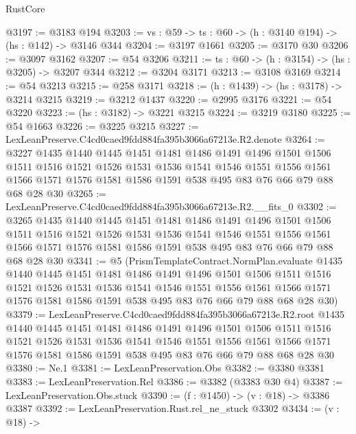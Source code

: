 \begin{lexlean}{RustCore}
\begin{coremodule}
@3197 := @3183 @194
@3203 := {vs : @59} -> {ts : @60} -> (h : @3140 @194) -> (hs : @142) -> @3146 @344
@3204 := @3197 @1661
@3205 := @3170 @30
@3206 := @3097 @3162
@3207 := @54 @3206
@3211 := {ts : @60} -> (h : @3154) -> (hs : @3205) -> @3207 @344
@3212 := @3204 @3171
@3213 := @3108 @3169
@3214 := @54 @3213
@3215 := @258 @3171
@3218 := (h : @1439) -> (hs : @3178) -> @3214 @3215
@3219 := @3212 @1437
@3220 := @2995 @3176
@3221 := @54 @3220
@3223 := (hs : @3182) -> @3221 @3215
@3224 := @3219 @3180
@3225 := @54 @1663
@3226 := @3225 @3215
@3227 := LexLeanPreserve.C4cd0caed9fdd884fa395b3066a67213e.R2.denote
@3264 := @3227
    @1435
    @1440
    @1445
    @1451
    @1481
    @1486
    @1491
    @1496
    @1501
    @1506
    @1511
    @1516
    @1521
    @1526
    @1531
    @1536
    @1541
    @1546
    @1551
    @1556
    @1561
    @1566
    @1571
    @1576
    @1581
    @1586
    @1591
    @538
    @495
    @83
    @76
    @66
    @79
    @88
    @68
    @28
    @30
@3265 := LexLeanPreserve.C4cd0caed9fdd884fa395b3066a67213e.R2.__fits_0
@3302 := @3265
    @1435
    @1440
    @1445
    @1451
    @1481
    @1486
    @1491
    @1496
    @1501
    @1506
    @1511
    @1516
    @1521
    @1526
    @1531
    @1536
    @1541
    @1546
    @1551
    @1556
    @1561
    @1566
    @1571
    @1576
    @1581
    @1586
    @1591
    @538
    @495
    @83
    @76
    @66
    @79
    @88
    @68
    @28
    @30
@3341 := @5
    (PrismTemplateContract.NormPlan.evaluate
      @1435
      @1440
      @1445
      @1451
      @1481
      @1486
      @1491
      @1496
      @1501
      @1506
      @1511
      @1516
      @1521
      @1526
      @1531
      @1536
      @1541
      @1546
      @1551
      @1556
      @1561
      @1566
      @1571
      @1576
      @1581
      @1586
      @1591
      @538
      @495
      @83
      @76
      @66
      @79
      @88
      @68
      @28
      @30)
@3379 := LexLeanPreserve.C4cd0caed9fdd884fa395b3066a67213e.R2.root
    @1435
    @1440
    @1445
    @1451
    @1481
    @1486
    @1491
    @1496
    @1501
    @1506
    @1511
    @1516
    @1521
    @1526
    @1531
    @1536
    @1541
    @1546
    @1551
    @1556
    @1561
    @1566
    @1571
    @1576
    @1581
    @1586
    @1591
    @538
    @495
    @83
    @76
    @66
    @79
    @88
    @68
    @28
    @30
@3380 := Ne.{1}
@3381 := LexLeanPreservation.Obs
@3382 := @3380 @3381
@3383 := LexLeanPreservation.Rel
@3386 := @3382 (@3383 @30 @4)
@3387 := LexLeanPreservation.Obs.stuck
@3390 := (f : @1450) -> (v : @18) -> @3386 @3387
@3392 := LexLeanPreservation.Rust.rel_ne_stuck @3302
@3434 := (v : @18) ->

\end{coremodule}
\end{lexlean}
